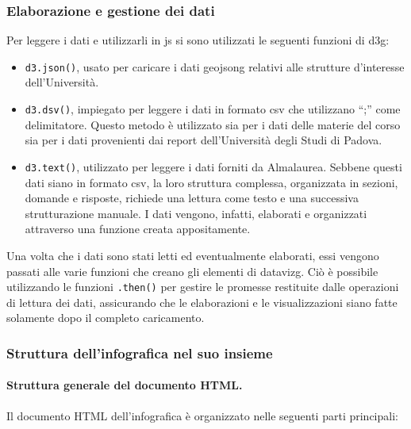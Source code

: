 \subsubsection{Elaborazione e gestione dei dati}
Per leggere i dati e utilizzarli in \gls{js} si sono utilizzati le seguenti funzioni di \gls{d3g}:
\begin{itemize}
    \item \texttt{d3.json()}, usato per caricare i dati \gls{geojsong} relativi alle strutture d'interesse dell'Università.
    \item \texttt{d3.dsv()}, impiegato per leggere i dati in formato \gls{csv} che utilizzano ``;'' come delimitatore. 
    Questo metodo è utilizzato sia per i dati delle materie del corso sia per i dati provenienti dai report dell'Università degli Studi di Padova.
    \item \texttt{d3.text()}, utilizzato per leggere i dati forniti da Almalaurea. Sebbene questi dati siano in formato \gls{csv}, la loro struttura complessa, 
    organizzata in sezioni, domande e risposte, richiede una lettura come testo e una successiva strutturazione manuale. 
    I dati vengono, infatti, elaborati e organizzati attraverso una funzione creata appositamente.
\end{itemize}
Una volta che i dati sono stati letti ed eventualmente elaborati, essi vengono passati alle varie funzioni che creano 
gli elementi di \gls{datavizg}. Ciò è possibile utilizzando le funzioni \texttt{.then()} per gestire le promesse restituite dalle operazioni 
di lettura dei dati, assicurando che le elaborazioni e le visualizzazioni siano fatte solamente dopo il completo caricamento. 


\subsubsection{Struttura dell'infografica nel suo insieme}
\paragraph{Struttura generale del documento HTML.} Il documento HTML dell'infografica è organizzato nelle seguenti parti principali:

